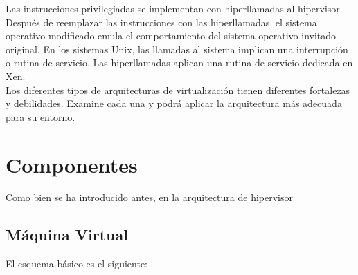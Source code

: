 Las instrucciones privilegiadas se implementan con hiperllamadas al hipervisor. Después de reemplazar las instrucciones con las hiperllamadas, el sistema operativo modificado emula el comportamiento del sistema operativo invitado original. En los sistemas Unix, las llamadas al sistema implican una interrupción o rutina de servicio. Las hiperllamadas aplican una rutina de servicio dedicada en Xen.\\

Los diferentes tipos de arquitecturas de virtualización tienen diferentes fortalezas y debilidades. Examine cada una y podrá aplicar la arquitectura más adecuada para su entorno.


\section{Componentes}

Como bien se ha introducido antes, en la arquitectura de hipervisor

\subsection{Máquina Virtual}
El esquema básico es el siguiente:

\begin{center}
\end{center}